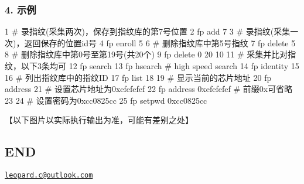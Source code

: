 \subsubsection*{4. 示例}


\begin{DoxyCode}
1 # 录指纹(采集两次)，保存到指纹库的第7号位置
2 fp add 7
3 # 录指纹(采集一次)，返回保存的位置id号
4 fp enroll
5 
6 # 删除指纹库中第5号指纹
7 fp delete 5
8 # 删除指纹库中第0号至第19号(共20个)
9 fp delete 0 20
10 
11 # 采集并比对指纹，以下3条均可
12 fp search
13 fp hsearch  # high speed search
14 fp identity
15 
16 # 列出指纹库中的指纹ID
17 fp list
18 
19 # 显示当前的芯片地址
20 fp address
21 # 设置芯片地址为0xefefefef
22 fp address 0xefefefef  # 前缀0x可省略
23 
24 # 设置密码为0xcc0825cc
25 fp setpwd 0xcc0825cc
\end{DoxyCode}


【以下图片以实际执行输出为准，可能有差别之处】





\subsection*{E\+N\+D}

\href{mailto:leopard.c@outlook.com}{\tt leopard.\+c@outlook.\+com} 